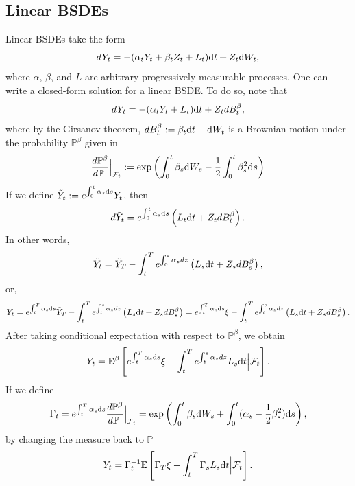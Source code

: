 \documentclass[11pt]{book}
\newcommand{\dt}{\text{\normalfont d}t}
\newcommand{\ds}{\text{\normalfont d}s}
\newcommand{\dW}{\text{\normalfont d}W}
\begin{document}
\subsection{Linear BSDEs}
Linear BSDEs take the form
\begin{equation}\label{eqn:linear_BSDE}
dY_t=-(\alpha_tY_t+\beta_tZ_t+L_t){{\dt}}+Z_t\dW_t,
\end{equation}
where $\alpha$, $\beta$, and $L$ are arbitrary progressively measurable processes.
One can write a closed-form solution for a linear BSDE. To do so, note that
\begin{equation}
	dY_t=-(\alpha_tY_t+L_t){{\dt}}+Z_tdB^{\beta}_t,
\end{equation}
where by the Girsanov theorem, $dB^{\beta}_t:=\beta_t{{\dt}}+\dW_t$ is a Brownian motion under the probability $\mathbb{P}^{\beta}$ given in
\begin{equation}
	\frac{d\mathbb{P}^{\beta}}{d\mathbb{P}~}\Big|_{\mathcal{F}_t}:=\exp\left(
	\int_0^t\beta_s \dW_s-\frac12\int_0^t\beta^2_s{{\ds}}
	\right)
\end{equation}
If we define $\tilde{Y}_t:=e^{\int_0^t \alpha_s{{\ds}}}Y_t$, then
\begin{equation}
	d\tilde{Y}_t=e^{\int_0^t \alpha_s {{\ds}}}\left(L_t{{\dt}}+Z_tdB^{\beta}_t\right).
\end{equation}
In other words,
\begin{equation}
	\tilde{Y}_t=\tilde{Y}_T-\int_{t}^{T} e^{\int_0^s \alpha_z dz}\left(L_s{{\dt}}+Z_sdB^{\beta}_s\right),
\end{equation}
or, 
\begin{equation}
	{Y}_t=e^{\int_t^T \alpha_s{{\ds}}}\tilde{Y}_T-\int_{t}^{T} e^{\int_t^s \alpha_z dz}\left(L_s{{\dt}}+Z_sdB^{\beta}_s\right)=e^{\int_t^T \alpha_s{{\ds}}}\xi-\int_{t}^{T} e^{\int_t^s \alpha_z dz}\left(L_s{{\dt}}+Z_sdB^{\beta}_s\right).
\end{equation}
After taking conditional expectation with respect to $\mathbb{P}^{\beta}$, we obtain
\begin{equation}
	Y_t=\mathbb{E}^{\beta}\left[e^{\int_t^T \alpha_s {{\ds}}}\xi-\int_{t}^{T} e^{\int_t^s \alpha_z dz}L_s{{\dt}}
	\Big|\mathcal{F}_t\right].
\end{equation}
If we define 
\begin{equation}
	\Gamma_t=e^{\int_t^T \alpha_s {{\ds}}}\frac{d\mathbb{P}^{\beta}}{d\mathbb{P}~}\Big|_{\mathcal{F}_t}=\exp\left(
	\int_0^t\beta_s \dW_s+\int_0^t(\alpha_s-\frac12\beta^2_s){{\ds}}
	\right),
\end{equation}
by changing the measure back to $\mathbb{P}$
\begin{equation}
	Y_t=\Gamma^{-1}_t\mathbb{E}\left[\Gamma_{T} \xi-\int_{t}^{T} \Gamma_{s} L_s{{\dt}}
	\Big|\mathcal{F}_t\right].
\end{equation}
\end{document}
